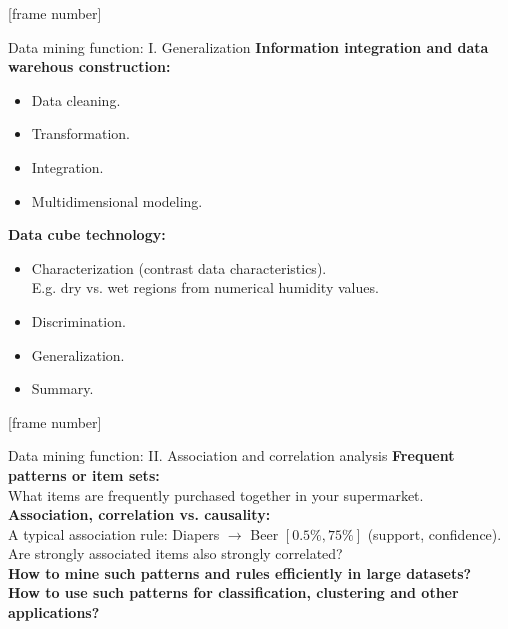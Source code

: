 \documentclass[aspectratio=169,t]{beamer}
\begin{document}
  {
    [frame number]
    \begin{frame}{Data mining function: I. Generalization}
    \textbf{Information integration and data warehous construction:}
    \begin{itemize}
        \item Data cleaning.
        \item Transformation.
        \item Integration.
        \item Multidimensional modeling.
    \end{itemize}
    \textbf{Data cube technology:}
    \begin{itemize}
        \item Characterization (contrast data characteristics).\\
              E.g. dry vs. wet regions from numerical humidity values.
        \item Discrimination.
        \item Generalization.
        \item Summary.
    \end{itemize}
    \end{frame}
  }

  {
    [frame number]
    \begin{frame}{Data mining function: II. Association and correlation analysis}
    \textbf{Frequent patterns or item sets:}\\
    What items are frequently purchased together in your supermarket.\\[0.5cm]

    \textbf{Association, correlation vs. causality:}\\
    A typical association rule: Diapers $\rightarrow$ Beer $[0.5\%,75\%]$ (support, confidence).\\
    Are strongly associated items also strongly correlated?\\[0.5cm]

    \textbf{How to mine such patterns and rules efficiently in large datasets?}\\
    \textbf{How to use such patterns for classification, clustering and other applications?}
    \end{frame}
  }
\end{document}
